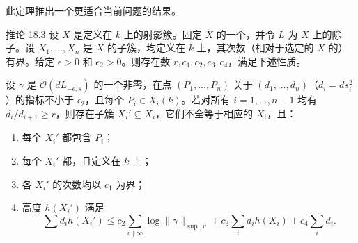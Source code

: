 此定理推出一个更适合当前问题的结果。
\begin{statement}{推论 18.3}
设 $X$ 是定义在 $k$ 上的射影簇。固定 $X$ 的一个，并令 $L$ 为 $X$ 上的除子。设 $X_1,\ldots,X_n$ 是 $X$ 的子簇，均定义在 $k$ 上，其次数（相对于选定的 $X$ 的）有界。给定 $\epsilon>0$ 和 $\epsilon_2>0$。则存在数 $r,c_1,c_2,c_3,c_4$，满足下述性质。

设 $\gamma$ 是 $\mathcal O(dL_{-\epsilon,s})$ 的一个非零，在点 $(P_1,\ldots,P_n)$ 关于 $(d_1,\ldots,d_n)$（$d_i=ds_i^2$）的指标不小于 $\epsilon_2$，且每个 $P_i\in X_i(k)$。若对所有 $i=1,\ldots,n-1$ 均有 $d_i/d_{i+1}\ge r$，则存在子簇 $X_i'\subseteq X_i$，它们不全等于相应的 $X_i$，且：
\begin{enumerate}[label=(\roman*).]
\item 每个 $X_i'$ 都包含 $P_i$；
\item 每个 $X_i'$ 都，且定义在 $k$ 上；
\item 各 $X_i'$ 的次数均以 $c_1$ 为界；
\item 高度 $h(X_i')$ 满足
\begin{equation*}\tag{18.4}
\sum d_i h(X_i')\le c_2\sum_{v\mid\infty}\log\|\gamma\|_{\sup,v}
+c_3\sum_i d_i h(X_i)+c_4\sum_i d_i.
\end{equation*}
\end{enumerate}
\end{statement}
